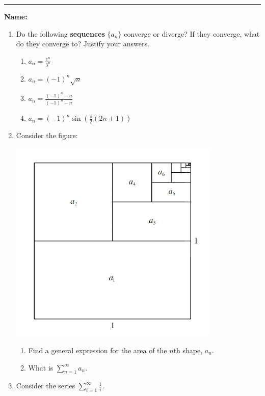 \documentclass[11pt]{article}
\let\ds\displaystyle
\begin{document}
    \hrule
    \vspace{.5cm}
    \noindent\textbf{Name:} \underline{\qquad\qquad\qquad\qquad\qquad\qquad\qquad\qquad\qquad\qquad\qquad\qquad\qquad}

    \begin{enumerate}
        \item Do the following \textbf{sequences} $\{a_{n}\}$ converge or diverge? If they converge, what do they converge to? Justify your answers.
        \begin{enumerate}
            \item $a_{n}=\ds\frac{e^{n}}{3^{n}}$\vfill
            \item $a_{n}=(-1)^{n}\sqrt{n}$\vfill
            \item $a_{n}=\ds\frac{(-1)^{n}+n}{(-1)^{n}-n}$\vfill
            \item $a_{n}=(-1)^{n}\sin\left(\frac{\pi}{2}(2n+1)\right)$\vfill
        \end{enumerate}
        \newpage
        \item Consider the figure:
        \begin{center}
            \includegraphics[width=10cm]{F24/Classwork 08/ws08.1.png}
        \end{center}
        \begin{enumerate}
            \item Find a general expression for the area of the $n$th shape, $a_{n}$.\vfill
            \item What is $\ds\sum_{n=1}^{\infty}a_{n}$.\vfill
        \end{enumerate}
        \newpage
        \item Consider the series $\ds\sum_{i=1}^{\infty}\ds\frac{1}{i}$.

\end{enumerate}
\end{document}

